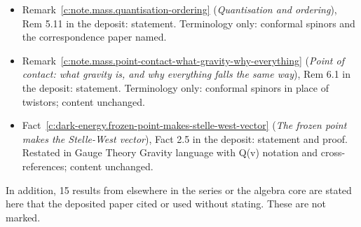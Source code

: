 \documentclass[11pt]{article}
\theoremstyle{definition}
\theoremstyle{plain}
\begin{document}
\begin{itemize}
\item Remark~\ref{c:note.mass.quantisation-ordering} (\emph{Quantisation and ordering}), Rem 5.11 in the deposit: statement. Terminology only: conformal spinors and the correspondence paper named.
\item Remark~\ref{c:note.mass.point-contact-what-gravity-why-everything} (\emph{Point of contact: what gravity is, and why everything falls the same way}), Rem 6.1 in the deposit: statement. Terminology only: conformal spinors in place of twistors; content unchanged.
\item Fact~\ref{c:dark-energy.frozen-point-makes-stelle-west-vector} (\emph{The frozen point makes the Stelle-West vector}), Fact 2.5 in the deposit: statement and proof. Restated in Gauge Theory Gravity language with Q(v) notation and cross-references; content unchanged.
\end{itemize}
\noindent In addition, 15 results from elsewhere in the series or the algebra core are stated here that the deposited paper cited or used without stating. These are not marked.
\end{document}
